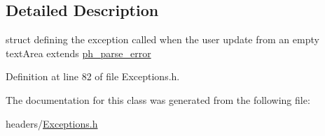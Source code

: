 \subsection{Detailed Description}
struct defining the exception called when the user update from an empty text\+Area extends \hyperlink{structph__parse__error}{ph\+\_\+parse\+\_\+error} 

Definition at line 82 of file Exceptions.\+h.



The documentation for this class was generated from the following file\+:\begin{DoxyCompactItemize}
\item 
headers/\hyperlink{Exceptions_8h}{Exceptions.\+h}\end{DoxyCompactItemize}
